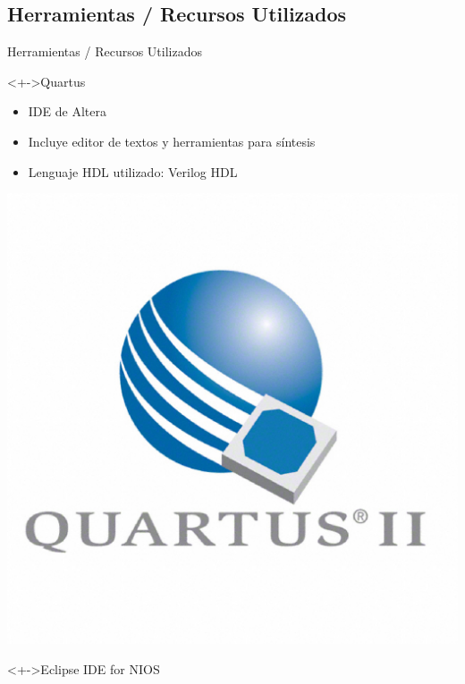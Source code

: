 \documentclass[xcolor=dvipsnames]{beamer}
\begin{document}
\subsection{Herramientas / Recursos Utilizados}
\begin{frame}{Herramientas / Recursos Utilizados}
\begin{block}<+->{Quartus} 
	
    \begin{itemize}
      \scriptsize
     	\item IDE de Altera
	\item Incluye editor de textos y herramientas para síntesis
	\item Lenguaje HDL utilizado: Verilog HDL
    \end{itemize} 
	\center
	\includegraphics[scale=0.10]{figures/Quartus.eps}  
  \end{block}
  \begin{block}<+->{Eclipse IDE for NIOS}   
	

\end{block}
\end{frame}
\end{document}
